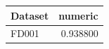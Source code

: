 \begin{tabular}{lr}
\toprule
Dataset & numeric \\
\midrule
FD001 & 0.938800 \\
\bottomrule
\end{tabular}
